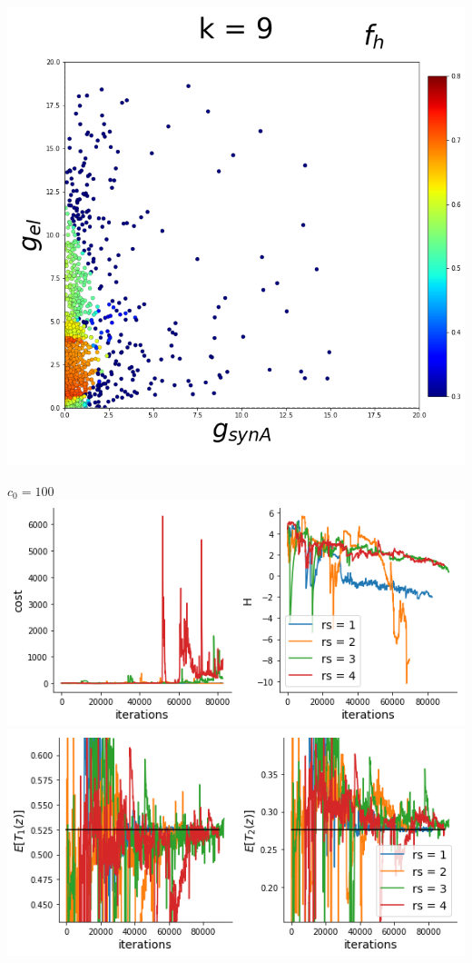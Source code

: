 \documentclass[11pt]{article}
\begin{document}
\begin{center}
\includegraphics[scale=0.125]{DSN_figs/STGCircuit_DSN_c=0_rs=4_k=9.png}
\end{center}

\clearpage

\begin{center}
{\Large $c_0 = 100$} \\
\includegraphics[scale=0.4]{DSN_figs/STG_DSN_c=2_H.png}
\includegraphics[scale=0.4]{DSN_figs/STG_DSN_c=2_cons.png} 
\end{center}
\end{document}
